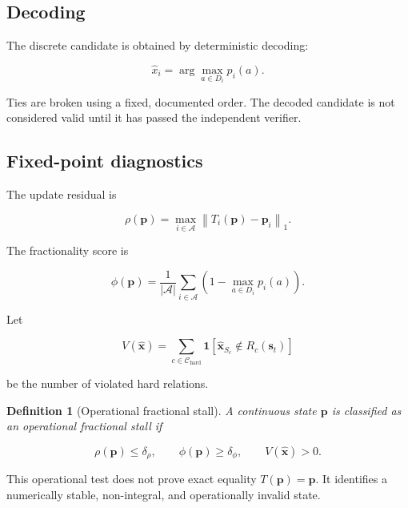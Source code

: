 \documentclass[pdflatex,sn-mathphys-num,iicol,oneside]{sn-jnl}
\newtheorem{definition}{Definition}
\begin{document}
\subsection{Decoding}

The discrete candidate is obtained by deterministic decoding:

\begin{equation}
\widehat{x}_i
=
\arg\max_{a\in D_i}p_i(a).
\label{eq:decode}
\end{equation}

Ties are broken using a fixed, documented order. The decoded candidate
is not considered valid until it has passed the independent verifier.

\subsection{Fixed-point diagnostics}

The update residual is

\begin{equation}
\rho(\bm{p})
=
\max_{i\in\mathcal{A}}
\left\|
T_i(\bm{p})-\bm{p}_i
\right\|_1.
\label{eq:residual}
\end{equation}

The fractionality score is

\begin{equation}
\phi(\bm{p})
=
\frac{1}{|\mathcal{A}|}
\sum_{i\in\mathcal{A}}
\left(
1-\max_{a\in D_i}p_i(a)
\right).
\label{eq:fractionality}
\end{equation}

Let

\begin{equation}
V(\widehat{\bm{x}})
=
\sum_{c\in\mathcal{C}_{\mathrm{hard}}}
\mathbf{1}
\left[
\widehat{\bm{x}}_{S_c}
\notin R_c(\bm{s}_t)
\right]
\label{eq:violations}
\end{equation}

be the number of violated hard relations.

\begin{definition}[Operational fractional stall]
A continuous state $\bm{p}$ is classified as an operational
fractional stall if

\begin{equation}
\rho(\bm{p})\leq\delta_{\rho},
\qquad
\phi(\bm{p})\geq\delta_{\phi},
\qquad
V(\widehat{\bm{x}})>0.
\end{equation}
\end{definition}

This operational test does not prove exact equality
$T(\bm{p})=\bm{p}$. It identifies a numerically stable, non-integral,
and operationally invalid state.
\end{document}
